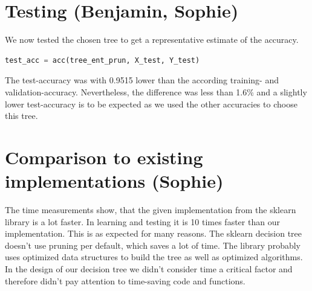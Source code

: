 \documentclass[12pt,a4paper]{scrartcl}		%
\begin{document}
\section{Testing (Benjamin, Sophie)}
We now tested the chosen tree to get a representative estimate of the accuracy. 

\begin{lstlisting}[language=Python]
    test_acc = acc(tree_ent_prun, X_test, Y_test)
\end{lstlisting}

The test-accuracy was with 0.9515 lower than the according training- and validation-accuracy. Nevertheless, 
the difference was less than 1.6\% and a slightly lower test-accuracy is to be expected as we used the other 
accuracies to choose this tree.  

\section{Comparison to existing implementations (Sophie)}
The time measurements show, that the given implementation from the sklearn library is a lot faster. In learning 
and testing it is 10 times faster than our implementation. This is as expected for many reasons.
The sklearn decision tree doesn't use pruning per default, which saves a lot of time. The library probably uses 
optimized data structures to build the tree as well as optimized algorithms. 
In the design of our decision tree we didn't consider time a critical factor and therefore didn't pay attention 
to time-saving code and functions.
\end{document}
